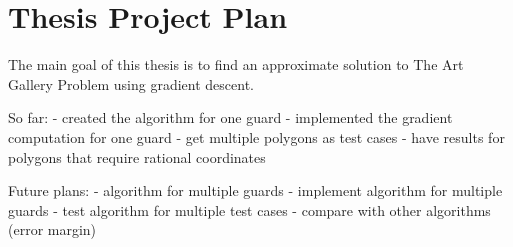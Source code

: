 \section{Thesis Project Plan}
\label{sec:thesis}

The main goal of this thesis is to find an approximate solution to The Art Gallery Problem \cite{o1987art} using gradient descent. 

So far:
- created the algorithm for one guard
- implemented the gradient computation for one guard
- get multiple polygons as test cases
- have results for polygons that require rational coordinates

Future plans:
- algorithm for multiple guards
- implement algorithm for multiple guards
- test algorithm for multiple test cases 
- compare with other algorithms (error margin)